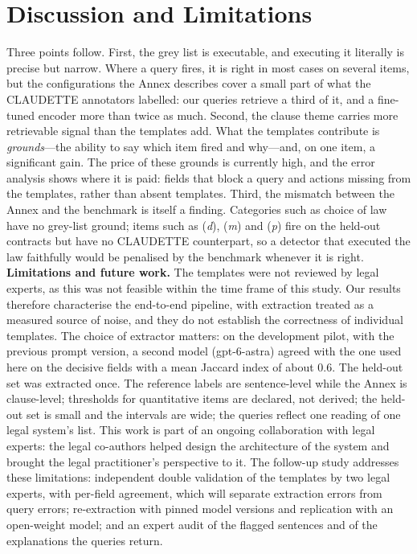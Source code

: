 \documentclass{IOS-Book-Article}
\newcommand{\corpus}{CLAUDETTE}
\newcommand{\gi}[1]{(\textit{#1})}
\begin{document}
\section{Discussion and Limitations}
\label{sec:discussion}
Three points follow. First, the grey list is executable, and executing it literally is precise but narrow. Where a query fires, it is right in most cases on several items, but the configurations the Annex describes cover a small part of what the \corpus{} annotators labelled: our queries retrieve a third of it, and a fine-tuned encoder more than twice as much. Second, the clause theme carries more retrievable signal than the templates add. What the templates contribute is \emph{grounds}---the ability to say which item fired and why---and, on one item, a significant gain. The price of these grounds is currently high, and the error analysis shows where it is paid: fields that block a query and actions missing from the templates, rather than absent templates. Third, the mismatch between the Annex and the benchmark is itself a finding. Categories such as choice of law have no grey-list ground; items such as \gi{d}, \gi{m} and \gi{p} fire on the held-out contracts but have no \corpus{} counterpart, so a detector that executed the law faithfully would be penalised by the benchmark whenever it is right. \textbf{Limitations and future work.} The templates were not reviewed by legal experts, as this was not feasible within the time frame of this study. Our results therefore characterise the end-to-end pipeline, with extraction treated as a measured source of noise, and they do not establish the correctness of individual templates. The choice of extractor matters: on the development pilot, with the previous prompt version, a second model (gpt-6-astra) agreed with the one used here on the decisive fields with a mean Jaccard index of about 0.6. The held-out set was extracted once. The reference labels are sentence-level while the Annex is clause-level; thresholds for quantitative items are declared, not derived; the held-out set is small and the intervals are wide; the queries reflect one reading of one legal system's list. This work is part of an ongoing collaboration with legal experts: the legal co-authors helped design the architecture of the system and brought the legal practitioner's perspective to it. The follow-up study addresses these limitations: independent double validation of the templates by two legal experts, with per-field agreement, which will separate extraction errors from query errors; re-extraction with pinned model versions and replication with an open-weight model; and an expert audit of the flagged sentences and of the explanations the queries return.
\end{document}
